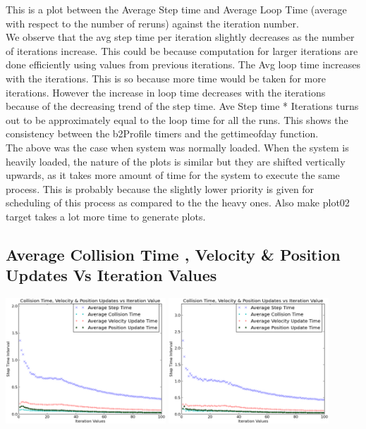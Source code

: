 \documentclass[11pt, a4paper]{article}
\begin{document}
This is a plot between the Average Step time and Average Loop Time (average with respect to the number of reruns) against the iteration number. \\
We observe that the avg step time per iteration slightly decreases as the number of iterations increase. This could be because computation for larger iterations are done efficiently using values from previous iterations.  The Avg loop time increases with the iterations. This is so because more time would be taken for more iterations. However the increase in loop time decreases with the iterations because of the decreasing trend of the step time. Ave Step time * Iterations turns out to be approximately equal to the loop time for all the runs. This shows the consistency between the b2Profile timers and the gettimeofday function. \\
The above was the case when system was normally loaded. When the system is heavily loaded, the nature of the plots is similar but they are shifted vertically upwards, as it takes more amount of time for the system to execute the same process. This is probably  because the slightly lower priority is given for scheduling of this process as compared to the the heavy ones. Also make plot02 target takes a lot more time to generate plots.
   

\subsection{Average Collision Time , Velocity \& Position Updates Vs Iteration Values}

\begin{center}
\includegraphics[width = 6cm]{plots-normal/l2.eps}
\includegraphics[width = 6cm]{plots-high/h2.eps}
\end{center}
\end{document}
